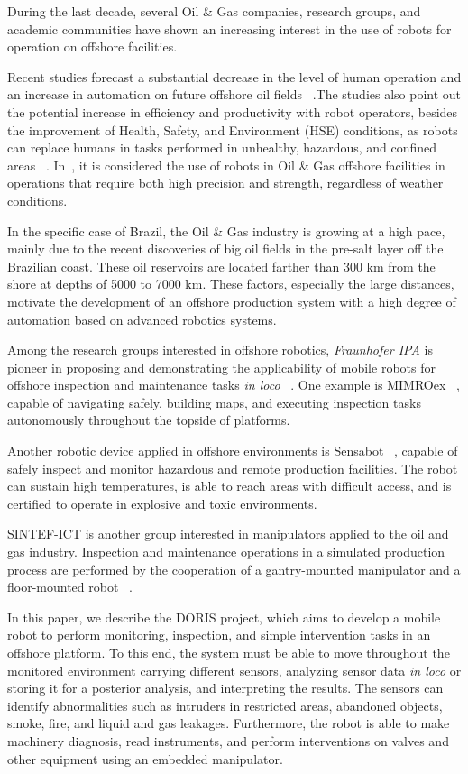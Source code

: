 \documentclass{ifacconf}
\begin{document}
During the last decade, several Oil \& Gas companies, research groups, and
academic communities have shown an increasing interest in the use of robots for
operation on offshore facilities.  

Recent studies forecast a substantial decrease in the level of human operation
and an increase in automation on future offshore oil fields
~\cite{skourup2009robotized}.The studies also point out the potential increase
in efficiency and productivity with robot operators, besides the improvement of
Health, Safety, and Environment (HSE) conditions, as robots can replace humans
in tasks performed in unhealthy, hazardous, and confined areas ~\cite{pal}. 
In~\cite{abb}, it is considered the use of robots in Oil \& Gas offshore
facilities in operations that require both high precision and strength,
regardless of weather conditions.

In the specific case of Brazil, the Oil \& Gas industry is growing at a high
pace, mainly due to the recent discoveries of big oil fields in the pre-salt
layer off the Brazilian coast. These oil reservoirs are located farther than
300 km from the shore at depths of 5000 to 7000 km. These factors,
especially the large distances, motivate the development of an offshore
production system with a high degree of automation based on advanced robotics
systems.

Among the research groups interested in offshore robotics, \emph{Fraunhofer
IPA} is pioneer in proposing and demonstrating the applicability of mobile
robots for offshore inspection and maintenance tasks \emph{in
loco} ~\cite{mimroex2}. One example is MIMROex ~\cite{mimroex}, capable of
navigating safely, building maps, and executing inspection tasks autonomously
throughout the topside of platforms.

Another robotic device applied in offshore environments is Sensabot
~\cite{sensabot}, capable of safely inspect and monitor hazardous and remote
production facilities. The robot can sustain high temperatures, is able to
reach areas with difficult access, and is certified to operate in explosive and
toxic environments.

SINTEF-ICT is another group interested in manipulators applied to the oil and
gas industry. Inspection and maintenance operations in a simulated production
process are performed by the cooperation of a gantry-mounted manipulator and a
floor-mounted robot ~\cite{kyrkjebo2009robotic}.

In this paper, we describe the DORIS project, which aims to develop a mobile
robot to perform monitoring, inspection, and simple intervention tasks in an
offshore platform. To this end, the system must be able to move throughout the
monitored environment carrying different sensors, analyzing sensor data
\emph{in loco} or storing it for a posterior analysis, and interpreting the
results. The sensors can identify abnormalities such as intruders in restricted
areas, abandoned objects, smoke, fire, and liquid and gas leakages.
Furthermore, the robot is able to make machinery diagnosis, read instruments,
and perform interventions on valves and other equipment using an embedded manipulator.
\end{document}
